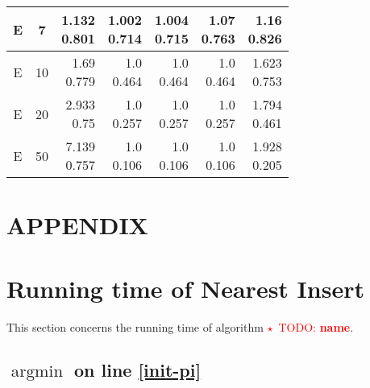 \documentclass{article}
\newcommand{\todo}[1]{\textcolor{red}{$\star$~TODO: \textbf{#1}}}
\DeclareMathOperator*{\argmin}{argmin}
\renewcommand{\thesection}{\Alph{section}}
\begin{document}
\begin{tabular}{|c c|r r r r r|}
  \hline
  E & 7 & \shortstack{ 1.132 \\ 0.801 } & \shortstack{ 1.002 \\ 0.714 } & \shortstack{ 1.004 \\ 0.715 } & \shortstack{ 1.07 \\ 0.763 } & \shortstack{ 1.16 \\ 0.826 } \\ 
  \hline
  E & 10 & \shortstack{ 1.69 \\ 0.779 } & \shortstack{ 1.0 \\ 0.464 } & \shortstack{ 1.0 \\ 0.464 } & \shortstack{ 1.0 \\ 0.464 } & \shortstack{ 1.623 \\ 0.753 } \\ 
  \hline
  E & 20 & \shortstack{ 2.933 \\ 0.75 } & \shortstack{ 1.0 \\ 0.257 } & \shortstack{ 1.0 \\ 0.257 } & \shortstack{ 1.0 \\ 0.257 } & \shortstack{ 1.794 \\ 0.461 } \\ 
  \hline
  E & 50 & \shortstack{ 7.139 \\ 0.757 } & \shortstack{ 1.0 \\ 0.106 } & \shortstack{ 1.0 \\ 0.106 } & \shortstack{ 1.0 \\ 0.106 } & \shortstack{ 1.928 \\ 0.205 } \\ 
  \hline
\end{tabular}

\appendix
\section*{APPENDIX}
\renewcommand{\thesection}{\roman{section}}
\section{Running time of Nearest Insert}
\label{appendix:runtime-ni}

This section concerns the running time of algorithm \todo{name}.

\subsection{$\argmin$ on line \ref*{init-pi}}
\end{document}
